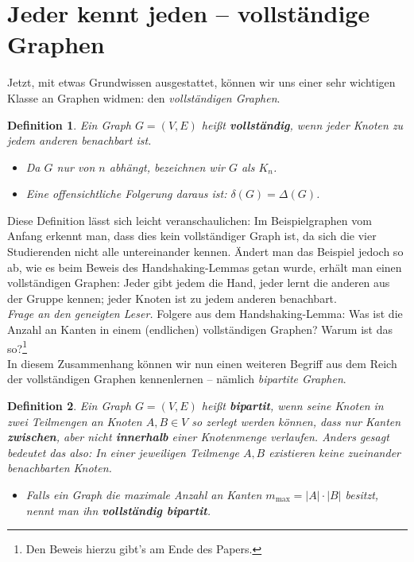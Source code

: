 \documentclass{article}
\newtheorem{definition}{Definition}
\theoremstyle{plain}
\begin{document}
\section{Jeder kennt jeden -- vollständige Graphen}
Jetzt, mit etwas Grundwissen ausgestattet, können wir uns einer sehr wichtigen Klasse an Graphen widmen: den \emph{vollständigen Graphen}.\\
\begin{definition}
	Ein Graph $G = (V, E)$ heißt \textbf{vollständig}, wenn jeder Knoten zu jedem anderen benachbart ist.
	\begin{itemize}
		\item[$\rightarrow$] Da $G$ nur von $n$ abhängt, bezeichnen wir $G$ als $K_n$.
		\item[$\rightarrow$] Eine offensichtliche Folgerung daraus ist: $\delta(G) = \Delta(G)$.
	\end{itemize}
\end{definition}
\bigskip
Diese Definition lässt sich leicht veranschaulichen: Im Beispielgraphen vom Anfang erkennt man, dass dies kein vollständiger Graph ist, da sich die vier Studierenden nicht alle untereinander kennen. Ändert man das Beispiel jedoch so ab, wie es beim Beweis des Handshaking-Lemmas getan wurde, erhält man einen vollständigen Graphen: Jeder gibt jedem die Hand, jeder lernt die anderen aus der Gruppe kennen; jeder Knoten ist zu jedem anderen benachbart.\\
\bigskip
\emph{Frage an den geneigten Leser.} Folgere aus dem Handshaking-Lemma: Was ist die Anzahl an Kanten in einem (endlichen) vollständigen Graphen? Warum ist das so?\footnote[1]{Den Beweis hierzu gibt's am Ende des Papers.}\\
\bigskip
In diesem Zusammenhang können wir nun einen weiteren Begriff aus dem Reich der vollständigen Graphen kennenlernen -- nämlich \emph{bipartite Graphen}.\\
\begin{definition}
	Ein Graph $G = (V, E)$ heißt \textbf{bipartit}, wenn seine Knoten in zwei Teilmengen an Knoten $A, B \in V$ so zerlegt werden können, dass nur Kanten \textbf{zwischen}, aber nicht \textbf{innerhalb} einer Knotenmenge verlaufen. Anders gesagt bedeutet das also: In einer jeweiligen Teilmenge $A, B$ existieren keine zueinander benachbarten Knoten.
	\begin{itemize}
		\item[$\rightarrow$] Falls ein Graph die \emph{maximale Anzahl an Kanten} $m_{\mathrm{max}} = |A| \cdot |B|$ besitzt, nennt man ihn \textbf{vollständig bipartit}.
	\end{itemize}
\end{definition}
\end{document}

